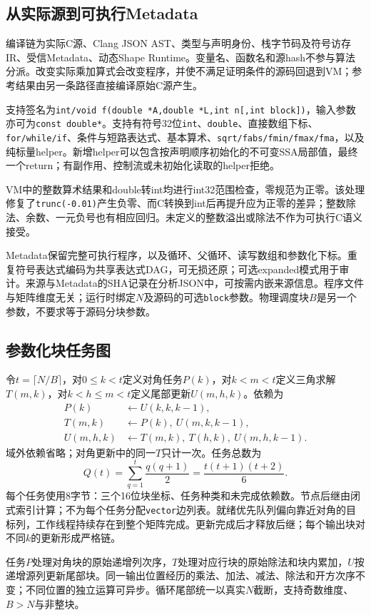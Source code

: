 \documentclass[UTF8,a4paper,11pt]{ctexart}
\begin{document}
\subsection{从实际源到可执行Metadata}
编译链为实际C源、Clang JSON AST、类型与声明身份、栈字节码及符号访存IR、受信Metadata、动态Shape Runtime。变量名、函数名和源hash不参与算法分派。改变实际乘加算式会改变程序，并使不满足证明条件的源码回退到VM；参考结果由另一条路径直接编译原始C源产生。

支持签名为\texttt{int/void f(double *A,double *L,int n[,int block])}，输入参数亦可为\texttt{const double*}。支持有符号32位\texttt{int}、\texttt{double}、直接数组下标、\texttt{for/while/if}、条件与短路表达式、基本算术、\texttt{sqrt/fabs/fmin/fmax/fma}，以及纯标量helper。新增helper可以包含按声明顺序初始化的不可变SSA局部值，最终一个return；有副作用、控制流或未初始化读取的helper拒绝。

VM中的整数算术结果和double转int均进行int32范围检查，零规范为正零。该处理修复了\texttt{trunc(-0.01)}产生负零、而C转换到int后再提升应为正零的差异；整数除法、余数、一元负号也有相应回归。未定义的整数溢出或除法不作为可执行C语义接受。

Metadata保留完整可执行程序，以及循环、父循环、读写数组和参数化下标。重复符号表达式编码为共享表达式DAG，可无损还原；可选expanded模式用于审计。来源与Metadata的SHA记录在分析JSON中，可按需内嵌来源信息。程序文件与矩阵维度无关；运行时绑定$N$及源码的可选\texttt{block}参数。物理调度块$B$是另一个参数，不要求等于源码分块参数。

\subsection{参数化块任务图}
令$t=\lceil N/B\rceil$，对$0\leq k<t$定义对角任务$P(k)$，对$k<m<t$定义三角求解$T(m,k)$，对$k<h\leq m<t$定义尾部更新$U(m,h,k)$。依赖为
\begin{align*}
P(k)&\leftarrow U(k,k,k-1),\\
T(m,k)&\leftarrow P(k),\ U(m,k,k-1),\\
U(m,h,k)&\leftarrow T(m,k),\ T(h,k),\ U(m,h,k-1).
\end{align*}
域外依赖省略；对角更新中的同一$T$只计一次。任务总数为
\[
Q(t)=\sum_{q=1}^{t}\frac{q(q+1)}2=\frac{t(t+1)(t+2)}6.
\]
每个任务使用8字节：三个16位块坐标、任务种类和未完成依赖数。节点后继由闭式索引计算；不为每个任务分配\texttt{vector}边列表。就绪优先队列偏向靠近对角的目标列，工作线程持续存在到整个矩阵完成。更新完成后才释放后继；每个输出块对不同$k$的更新形成严格链。

任务$P$处理对角块的原始递增列次序，$T$处理对应行块的原始除法和块内累加，$U$按递增源列更新尾部块。同一输出位置经历的乘法、加法、减法、除法和开方次序不变；不同位置的独立运算可异步。循环尾部统一以真实$N$截断，支持奇数维度、$B>N$与非整块。
\end{document}
